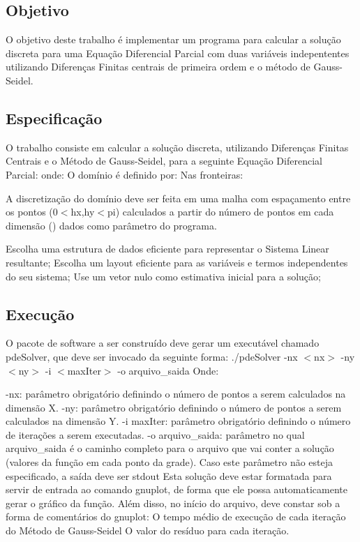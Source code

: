 \subsection*{Objetivo}

O objetivo deste trabalho é implementar um programa para calcular a solução discreta para uma Equação Diferencial Parcial com duas variáveis indepententes utilizando Diferenças Finitas centrais de primeira ordem e o método de Gauss-\/\+Seidel. \subsection*{Especificação}

O trabalho consiste em calcular a solução discreta, utilizando Diferenças Finitas Centrais e o Método de Gauss-\/\+Seidel, para a seguinte Equação Diferencial Parcial\+:  onde\+:   O domínio é definido por\+:  Nas fronteiras\+:    

A discretização do domínio deve ser feita em uma malha com espaçamento entre os pontos (0$<$hx,hy$<$pi) calculados a partir do número de pontos em cada dimensão () dados como parâmetro do programa. \begin{DoxyVerb}Escolha uma estrutura de dados eficiente para representar o Sistema Linear resultante;
Escolha um layout eficiente para as variáveis e termos independentes do seu sistema;
Use um vetor nulo como estimativa inicial para a solução;
\end{DoxyVerb}


\subsection*{Execução}

O pacote de software a ser construído deve gerar um executável chamado pde\+Solver, que deve ser invocado da seguinte forma\+: ./pde\+Solver -\/nx $<$nx$>$ -\/ny $<$ny$>$ -\/i $<$max\+Iter$>$ -\/o arquivo\+\_\+saida Onde\+:

-\/nx\+: parâmetro obrigatório definindo o número de pontos a serem calculados na dimensão X. -\/ny\+: parâmetro obrigatório definindo o número de pontos a serem calculados na dimensão Y. -\/i max\+Iter\+: parâmetro obrigatório definindo o número de iterações a serem executadas. -\/o arquivo\+\_\+saida\+: parâmetro no qual arquivo\+\_\+saida é o caminho completo para o arquivo que vai conter a solução (valores da função em cada ponto da grade). Caso este parâmetro não esteja especificado, a saída deve ser stdout Esta solução deve estar formatada para servir de entrada ao comando gnuplot, de forma que ele possa automaticamente gerar o gráfico da função. Além disso, no início do arquivo, deve constar sob a forma de comentários do gnuplot\+: O tempo médio de execução de cada iteração do Método de Gauss-\/\+Seidel O valor do resíduo para cada iteração.

